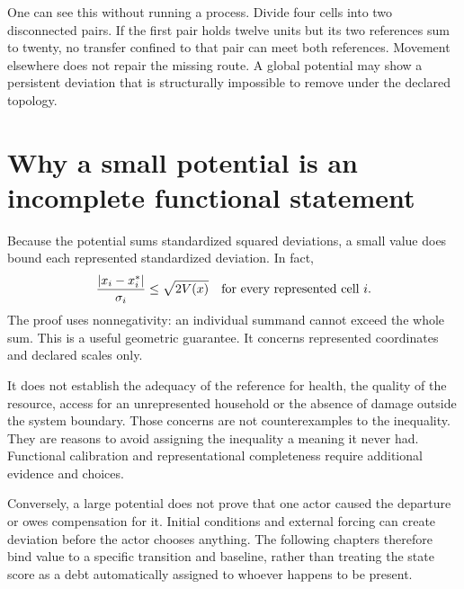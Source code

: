 One can see this without running a process. Divide four cells into two
disconnected pairs. If the first pair holds twelve units but its two
references sum to twenty, no transfer confined to that pair can meet both
references. Movement elsewhere does not repair the missing route. A global
potential may show a persistent deviation that is structurally impossible
to remove under the declared topology.

\section{Why a small potential is an incomplete functional statement}
Because the potential sums standardized squared deviations, a small value
does bound each represented standardized deviation. In fact,
\begin{equation}
 \frac{|x_i-x_i^*|}{\sigma_i}\leq\sqrt{2V(x)}
 \quad\hbox{for every represented cell }i.
\end{equation}
The proof uses nonnegativity: an individual summand cannot exceed the
whole sum. This is a useful geometric guarantee. It concerns represented
coordinates and declared scales only.

It does not establish the adequacy of the reference for health, the
quality of the resource, access for an unrepresented household or the
absence of damage outside the system boundary. Those concerns are not
counterexamples to the inequality. They are reasons to avoid assigning
the inequality a meaning it never had. Functional calibration and
representational completeness require additional evidence and choices.

Conversely, a large potential does not prove that one actor caused the
departure or owes compensation for it. Initial conditions and external
forcing can create deviation before the actor chooses anything. The
following chapters therefore bind value to a specific transition and
baseline, rather than treating the state score as a debt automatically
assigned to whoever happens to be present.
